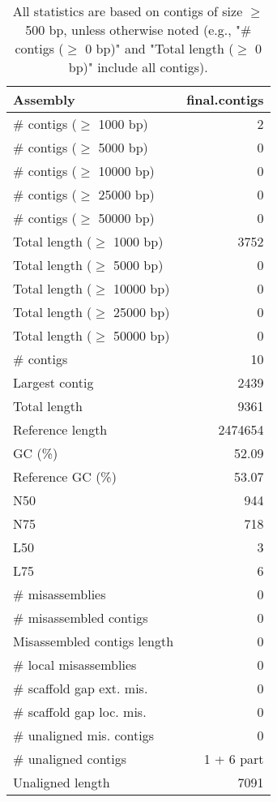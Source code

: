 \documentclass[12pt,a4paper]{article}
\begin{document}
\begin{table}[ht]
\begin{center}
\caption{All statistics are based on contigs of size $\geq$ 500 bp, unless otherwise noted (e.g., "\# contigs ($\geq$ 0 bp)" and "Total length ($\geq$ 0 bp)" include all contigs).}
\begin{tabular}{|l*{1}{|r}|}
\hline
Assembly & final.contigs \\ \hline
\# contigs ($\geq$ 1000 bp) & 2 \\ \hline
\# contigs ($\geq$ 5000 bp) & 0 \\ \hline
\# contigs ($\geq$ 10000 bp) & 0 \\ \hline
\# contigs ($\geq$ 25000 bp) & 0 \\ \hline
\# contigs ($\geq$ 50000 bp) & 0 \\ \hline
Total length ($\geq$ 1000 bp) & 3752 \\ \hline
Total length ($\geq$ 5000 bp) & 0 \\ \hline
Total length ($\geq$ 10000 bp) & 0 \\ \hline
Total length ($\geq$ 25000 bp) & 0 \\ \hline
Total length ($\geq$ 50000 bp) & 0 \\ \hline
\# contigs & 10 \\ \hline
Largest contig & 2439 \\ \hline
Total length & 9361 \\ \hline
Reference length & 2474654 \\ \hline
GC (\%) & 52.09 \\ \hline
Reference GC (\%) & 53.07 \\ \hline
N50 & 944 \\ \hline
N75 & 718 \\ \hline
L50 & 3 \\ \hline
L75 & 6 \\ \hline
\# misassemblies & 0 \\ \hline
\# misassembled contigs & 0 \\ \hline
Misassembled contigs length & 0 \\ \hline
\# local misassemblies & 0 \\ \hline
\# scaffold gap ext. mis. & 0 \\ \hline
\# scaffold gap loc. mis. & 0 \\ \hline
\# unaligned mis. contigs & 0 \\ \hline
\# unaligned contigs & 1 + 6 part \\ \hline
Unaligned length & 7091 \\ \hline

\end{tabular}
\end{center}
\end{table}
\end{document}
